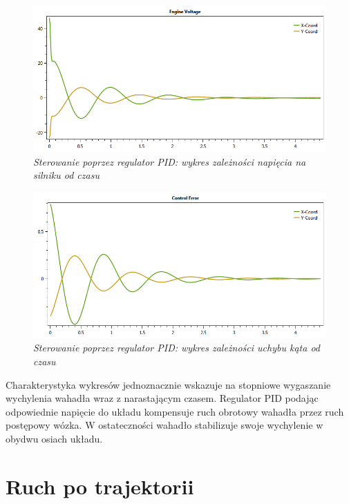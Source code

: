 \documentclass[12pt, oneside]{report}
\theoremstyle{definition}
\begin{document}
\begin{figure}[H]
	\centering
		\includegraphics[width = 350pt]{PIDEV} 
		\caption{\textit{Sterowanie poprzez regulator PID: wykres zależności napięcia na silniku od czasu}}
		\label{plot:PIDEV}
\end{figure}

\begin{figure}[H]
	\centering
		\includegraphics[width = 350pt]{PIDCE} 
		\caption{\textit{Sterowanie poprzez regulator PID: wykres zależności uchybu kąta od czasu}}
		\label{plot:PIDCE}
\end{figure}

Charakterystyka wykresów jednoznacznie wskazuje na stopniowe wygaszanie wychylenia wahadła wraz z narastającym czasem. Regulator PID podając odpowiednie napięcie do układu kompensuje ruch obrotowy wahadła przez ruch postępowy wózka. W ostateczności wahadło stabilizuje swoje wychylenie w obydwu osiach układu.

\section{Ruch po trajektorii}
\end{document}
